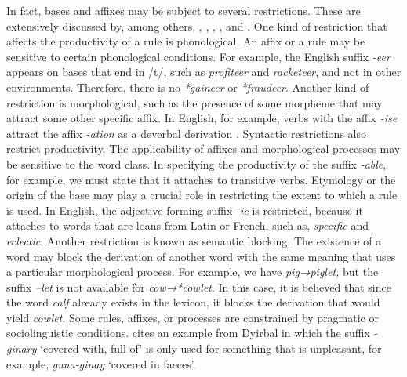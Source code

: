 \documentclass[output=paper]{langsci/langscibook}
\begin{document}
In fact, bases and affixes may be subject to several restrictions. These are extensively discussed by, among others, \citet{Bauer2001}, \citet{HaspelmathSims2010}, \citet{Lieber2009}, \citet{Rainer2005}, and \citet{Plag2006}. One kind of restriction that affects the productivity of a rule is phonological. An affix or a rule may be sensitive to certain phonological conditions. For example, the English suffix \textit{-eer} appears on bases that end in /t/, such as \textit{profiteer} and \textit{racketeer}, and not in other environments. Therefore, there is no \textit{*gaineer} or \textit{*fraudeer}. Another kind of restriction is morphological, such as the presence of some morpheme that may attract some other specific affix. In English, for example, verbs with the affix \textit{-ise} attract the affix \textit{-ation} as a deverbal derivation \citep{Fernandez-Dominguez2013}. Syntactic restrictions also restrict productivity. The applicability of affixes and morphological processes may be sensitive to the word class. In specifying the productivity of the suffix \textit{-able}, for example, we must state that it attaches to transitive verbs. Etymology or the origin of the base may play a crucial role in restricting the extent to which a rule is used. In English, the adjective-forming suffix \textit{-ic} is restricted, because it attaches to words that are loans from Latin or French, such as, \textit{specific} and \textit{eclectic}. Another restriction is known as semantic blocking. The existence of a word may block the derivation of another word with the same meaning that uses a particular morphological process. For example, we have \textit{pig→piglet,} but the suffix \textit{–let} is not available for \textit{cow→*cowlet}. In this case, it is believed that since the word \textit{calf} already exists in the lexicon, it blocks the derivation that would yield \textit{cowlet}. Some rules, affixes, or processes are constrained by pragmatic or sociolinguistic conditions. \citet[135]{Bauer2001} cites an example from Dyirbal in which the suffix \textit{-ginary} ‘covered with, full of’ is only used for something that is unpleasant, for example, \textit{guna-ginay} ‘covered in faeces’. 
\end{document}
